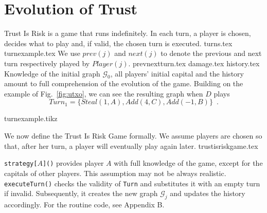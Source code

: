 \section{Evolution of Trust}
  Trust Is Risk is a game that runs indefinitely. In each turn, a player is chosen, decides what to play and, if valid, the
  chosen turn is executed.
  {turns.tex}
  \ifdefined\proceedings
  \else
    {turnexample.tex}
    We use $prev\left(j\right)$ and $next\left(j\right)$ to denote the previous and next turn respectively played by
    $Player(j)$.
  \fi
  {prevnextturn.tex}
  {damage.tex}
  {history.tex}
  \noindent Knowledge of the initial graph $\mathcal{G}_0$, all players' initial capital and the history amount to full
  comprehension of the evolution of the game. Building on the example of Fig.~\ref{fig:utxo}, we can see the resulting graph
  when $D$ plays
  \begin{equation}
  \label{turnexample}
     Turn_1 = \{Steal\left(1, A\right), Add\left(4, C\right), Add\left(-1, B\right)\} \enspace.
  \end{equation}
  \begin{figure*}
  {turnexample.tikz}
  \end{figure*}

  \noindent We now define the Trust Is Risk Game formally. We assume players are chosen so that, after her turn, a player will
  eventually play again later.
  {trustisriskgame.tex}

  \noindent \texttt{strategy[}$A$\texttt{]()} provides player $A$ with full knowledge of the game, except for the capitals of
  other players. This assumption may not be always realistic. \texttt{executeTurn()} checks the validity of \texttt{Turn} and
  substitutes it with an empty turn if invalid. Subsequently, it creates the new graph $\mathcal{G}_j$ and updates the
  history accordingly. \ifdefined\proceedings\else For the routine code, see Appendix B.\fi
